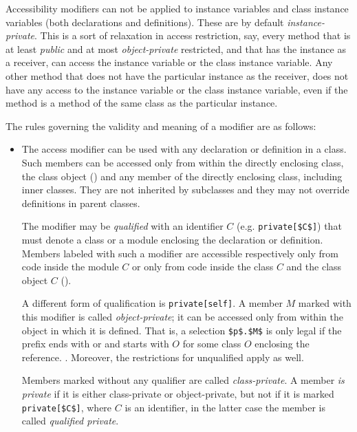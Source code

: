 Accessibility modifiers can not be applied to instance variables and class instance variables (both declarations and definitions). These are by default {\em instance-private}. This is a sort of relaxation in access restriction, say, every method that is at least {\em public} and at most {\em object-private} restricted, and that has the instance as a receiver, can access the instance variable or the class instance variable. Any other method that does not have the particular instance as the receiver, does not have any access to the instance variable or the class instance variable, even if the method is a method of the same class as the particular instance. 

The rules governing the validity and meaning of a modifier are as follows: 
\begin{itemize}
  \item The  access modifier can be used with any declaration or definition in a class. Such members can be accessed only from within the directly enclosing class, the class object () and any member of the directly enclosing class, including inner classes. They are not inherited by subclasses and they may not override definitions in parent classes. 

  The modifier may be {\em qualified} with an identifier $C$ (e.g. \lstinline!private[$C$]!) that must denote a class or a module enclosing the declaration or definition. Members labeled with such a modifier are accessible respectively only from code inside the module $C$ or only from code inside the class $C$ and the class object $C$ (). 

  A different form of qualification is \lstinline!private[self]!. A member $M$ marked with this modifier is called {\em object-private}; it can be accessed only from within the object in which it is defined. That is, a selection \lstinline!$p$.$M$! is only legal if the prefix ends with  or  and starts with $O$ for some class $O$ enclosing the reference. . Moreover, the restrictions for unqualified  apply as well. 

  Members marked  without any qualifier are called {\em class-private}. A member {\em is private} if it is either class-private or object-private, but not if it is marked \lstinline!private[$C$]!, where $C$ is an identifier, in the latter case the member is called {\em qualified private}. 


\end{itemize}
